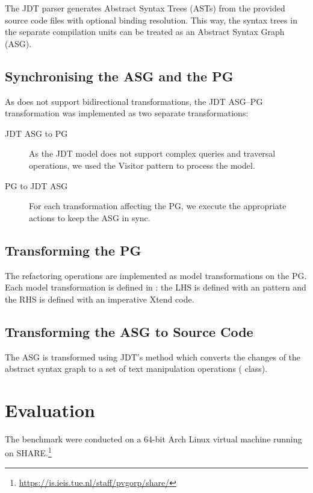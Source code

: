\documentclass[submission,copyright,creativecommons]{eptcs}
\begin{document}
The JDT parser generates Abstract Syntax Trees (ASTs) from the provided source code files with optional binding resolution. This way, the syntax trees in the separate compilation units can be treated as an Abstract Syntax Graph (ASG).


\subsection{Synchronising the ASG and the PG}

As \viatra does not support bidirectional transformations, the JDT ASG--PG transformation was implemented as two separate transformations:



\begin{description}
\item[JDT ASG to PG] As the JDT model does not support complex queries and traversal operations, we used the Visitor pattern to process the model.
\item[PG to JDT ASG] For each transformation affecting the PG, we execute the appropriate actions to keep the ASG in sync.
\end{description}

\subsection{Transforming the PG}

The refactoring operations are implemented as model transformations on the PG. Each model transformation is defined in \viatra: the LHS is defined with an \eiq pattern and the RHS is defined with an imperative Xtend code.

\subsection{Transforming the ASG to Source Code}

The ASG is transformed using JDT's  method which converts the changes of the abstract syntax graph to a set of text manipulation operations ( class).

\section{Evaluation}

The benchmark were conducted on a 64-bit Arch Linux virtual machine running on SHARE.\footnote{\url{https://is.ieis.tue.nl/staff/pvgorp/share/}}
\end{document}
